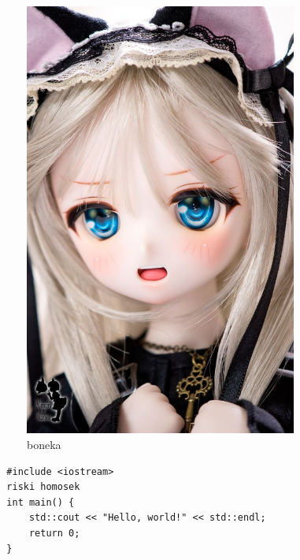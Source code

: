 \documentclass[a4paper, 12pt]{article}
\begin{document}
\begin{figure}
  \begin{center}
    \includegraphics[width=0.8\textwidth]{./boneka.jpg}
  \end{center}
  \caption{boneka}\label{fig:boneka}
\end{figure}


\begin{lstlisting}
  #include <iostream>
  riski homosek
  int main() {
      std::cout << "Hello, world!" << std::endl;
      return 0;
  }
\end{lstlisting}
\end{document}
